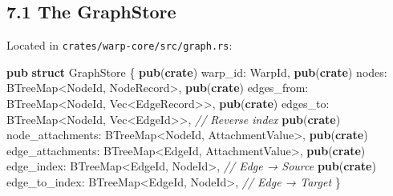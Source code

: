 \documentclass[
]{book}
\newenvironment{Shaded}{}{}
\newcommand{\CommentTok}[1]{\textcolor[rgb]{0.38,0.63,0.69}{\textit{#1}}}
\newcommand{\DataTypeTok}[1]{\textcolor[rgb]{0.56,0.13,0.00}{#1}}
\newcommand{\KeywordTok}[1]{\textcolor[rgb]{0.00,0.44,0.13}{\textbf{#1}}}
\newcommand{\NormalTok}[1]{#1}
\newcommand{\OperatorTok}[1]{\textcolor[rgb]{0.40,0.40,0.40}{#1}}
\begin{document}
\subsection{7.1 The GraphStore}\label{the-graphstore}

Located in \texttt{crates/warp-core/src/graph.rs}:

\begin{Shaded}
\begin{Highlighting}[]
\KeywordTok{pub} \KeywordTok{struct}\NormalTok{ GraphStore }\OperatorTok{\{}
    \KeywordTok{pub}\NormalTok{(}\KeywordTok{crate}\NormalTok{) warp\_id}\OperatorTok{:}\NormalTok{ WarpId}\OperatorTok{,}
    \KeywordTok{pub}\NormalTok{(}\KeywordTok{crate}\NormalTok{) nodes}\OperatorTok{:}\NormalTok{ BTreeMap}\OperatorTok{\textless{}}\NormalTok{NodeId}\OperatorTok{,}\NormalTok{ NodeRecord}\OperatorTok{\textgreater{},}
    \KeywordTok{pub}\NormalTok{(}\KeywordTok{crate}\NormalTok{) edges\_from}\OperatorTok{:}\NormalTok{ BTreeMap}\OperatorTok{\textless{}}\NormalTok{NodeId}\OperatorTok{,} \DataTypeTok{Vec}\OperatorTok{\textless{}}\NormalTok{EdgeRecord}\OperatorTok{\textgreater{}\textgreater{},}
    \KeywordTok{pub}\NormalTok{(}\KeywordTok{crate}\NormalTok{) edges\_to}\OperatorTok{:}\NormalTok{ BTreeMap}\OperatorTok{\textless{}}\NormalTok{NodeId}\OperatorTok{,} \DataTypeTok{Vec}\OperatorTok{\textless{}}\NormalTok{EdgeId}\OperatorTok{\textgreater{}\textgreater{},}  \CommentTok{// Reverse index}
    \KeywordTok{pub}\NormalTok{(}\KeywordTok{crate}\NormalTok{) node\_attachments}\OperatorTok{:}\NormalTok{ BTreeMap}\OperatorTok{\textless{}}\NormalTok{NodeId}\OperatorTok{,}\NormalTok{ AttachmentValue}\OperatorTok{\textgreater{},}
    \KeywordTok{pub}\NormalTok{(}\KeywordTok{crate}\NormalTok{) edge\_attachments}\OperatorTok{:}\NormalTok{ BTreeMap}\OperatorTok{\textless{}}\NormalTok{EdgeId}\OperatorTok{,}\NormalTok{ AttachmentValue}\OperatorTok{\textgreater{},}
    \KeywordTok{pub}\NormalTok{(}\KeywordTok{crate}\NormalTok{) edge\_index}\OperatorTok{:}\NormalTok{ BTreeMap}\OperatorTok{\textless{}}\NormalTok{EdgeId}\OperatorTok{,}\NormalTok{ NodeId}\OperatorTok{\textgreater{},}     \CommentTok{// Edge → Source}
    \KeywordTok{pub}\NormalTok{(}\KeywordTok{crate}\NormalTok{) edge\_to\_index}\OperatorTok{:}\NormalTok{ BTreeMap}\OperatorTok{\textless{}}\NormalTok{EdgeId}\OperatorTok{,}\NormalTok{ NodeId}\OperatorTok{\textgreater{},}  \CommentTok{// Edge → Target}
\OperatorTok{\}}
\end{Highlighting}
\end{Shaded}
\end{document}
